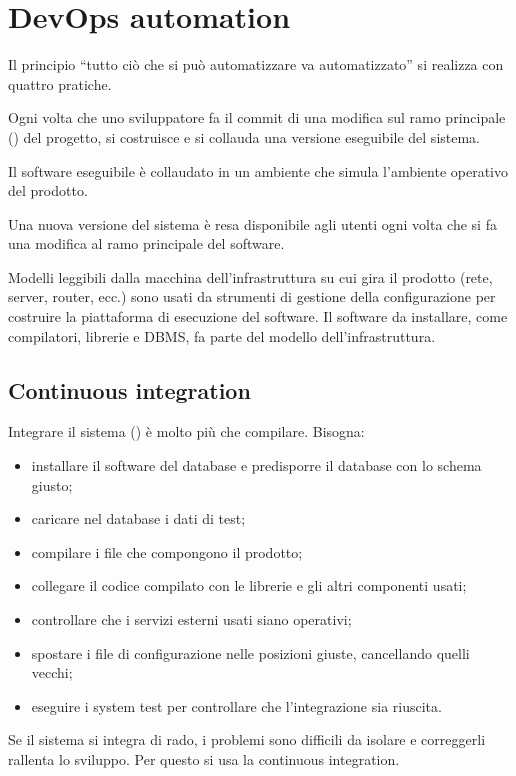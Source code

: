 \section{DevOps automation}
\label{sec:devops-automazione}

Il principio ``tutto ciò che si può automatizzare va automatizzato'' si realizza con quattro pratiche.

\begin{definizione}
\begin{description}[leftmargin=0pt, style=unboxed]
  \item[Continuous integration.] Ogni volta che uno sviluppatore fa il commit di una modifica sul ramo principale
    () del progetto, si costruisce e si collauda una versione eseguibile del sistema.
  \item[Continuous delivery.] Il software eseguibile è collaudato in un ambiente che simula l'ambiente operativo del
    prodotto.
  \item[Continuous deployment.] Una nuova versione del sistema è resa disponibile agli utenti ogni volta che si fa una
    modifica al ramo principale del software.
  \item[Infrastructure as code.] Modelli leggibili dalla macchina dell'infrastruttura su cui gira il prodotto (rete,
    server, router, ecc.) sono usati da strumenti di gestione della configurazione per costruire la piattaforma di
    esecuzione del software. Il software da installare, come compilatori, librerie e DBMS, fa parte del modello
    dell'infrastruttura.
\end{description}
\end{definizione}

\subsection{Continuous integration}
\label{sec:devops-ci}

Integrare il sistema () è molto più che compilare. Bisogna:
\begin{itemize}
  \item installare il software del database e predisporre il database con lo schema giusto;
  \item caricare nel database i dati di test;
  \item compilare i file che compongono il prodotto;
  \item collegare il codice compilato con le librerie e gli altri componenti usati;
  \item controllare che i servizi esterni usati siano operativi;
  \item spostare i file di configurazione nelle posizioni giuste, cancellando quelli vecchi;
  \item eseguire i system test per controllare che l'integrazione sia riuscita.
\end{itemize}
Se il sistema si integra di rado, i problemi sono difficili da isolare e correggerli rallenta lo sviluppo. Per questo
si usa la continuous integration.

